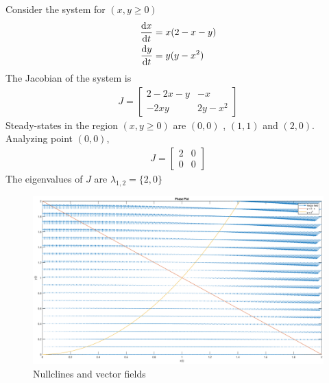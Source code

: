 \documentclass[12pt,1in]{article}
\newenvironment{Example}[2][Example]{\begin{trivlist}
		\item[\hskip \labelsep {\bfseries #1}\hskip \labelsep {\bfseries #2.}]}{\end{trivlist}}
\begin{document}
\begin{Example}{2}
	\cite[p.~488]{diff_eq}
	Consider the system for $(x,y \geq 0)$
	\begin{align*}
	\derivative{x}{t} &= x(2 - x - y)\\
	\derivative{y}{t} &= y(y - x^2)
	\end{align*}
	The Jacobian of the system is
	\begin{align*}
	J = \begin{bmatrix}
	2 -2x  -y & -x \\
	-2xy & 2y - x^2 
	\end{bmatrix}
	\end{align*}
	Steady-states in the region $(x,y \geq 0)$ are $(0,0)$ , $(1,1)$ and $(2,0)$. Analyzing point $(0,0)$,
	\begin{align*}
	J = \begin{bmatrix}
	2 & 0 \\
	0 & 0
	\end{bmatrix}
	\end{align*}
	The eigenvalues of $J$ are $\lambda_{1,2} = \{2, 0\}$
	
	
\begin{figure}[H]
	\centering
	\includegraphics[width=1\linewidth]{Figures/example_2}
	\caption{Nullclines and vector fields}
	\label{fig:example2}
\end{figure}
\end{Example}
\end{document}
